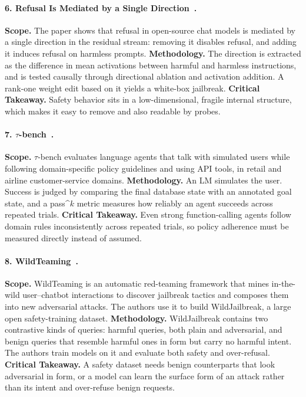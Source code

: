 \documentclass[sigconf,nonacm]{acmart}
\begin{document}
\paragraph{6. Refusal Is Mediated by a Single Direction~\cite{arditi2024refusal}.}
\textbf{Scope.} The paper shows that refusal in open-source chat models is mediated by a single direction in the residual stream: removing it disables refusal, and adding it induces refusal on harmless prompts.
\textbf{Methodology.} The direction is extracted as the difference in mean activations between harmful and harmless instructions, and is tested causally through directional ablation and activation addition. A rank-one weight edit based on it yields a white-box jailbreak.
\textbf{Critical Takeaway.} Safety behavior sits in a low-dimensional, fragile internal structure, which makes it easy to remove and also readable by probes.

\paragraph{7. $\tau$-bench~\cite{yao2025taubench}.}
\textbf{Scope.} $\tau$-bench evaluates language agents that talk with simulated users while following domain-specific policy guidelines and using API tools, in retail and airline customer-service domains.
\textbf{Methodology.} An LM simulates the user. Success is judged by comparing the final database state with an annotated goal state, and a pass\^{}$k$ metric measures how reliably an agent succeeds across repeated trials.
\textbf{Critical Takeaway.} Even strong function-calling agents follow domain rules inconsistently across repeated trials, so policy adherence must be measured directly instead of assumed.

\paragraph{8. WildTeaming~\cite{jiang2024wildteaming}.}
\textbf{Scope.} WildTeaming is an automatic red-teaming framework that mines in-the-wild user--chatbot interactions to discover jailbreak tactics and composes them into new adversarial attacks. The authors use it to build WildJailbreak, a large open safety-training dataset.
\textbf{Methodology.} WildJailbreak contains two contrastive kinds of queries: harmful queries, both plain and adversarial, and benign queries that resemble harmful ones in form but carry no harmful intent. The authors train models on it and evaluate both safety and over-refusal.
\textbf{Critical Takeaway.} A safety dataset needs benign counterparts that look adversarial in form, or a model can learn the surface form of an attack rather than its intent and over-refuse benign requests.
\end{document}
